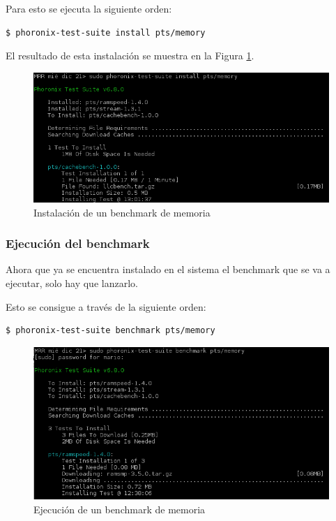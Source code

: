 Para esto se ejecuta la siguiente orden:
\begin{lstlisting}[style=fich]
$ phoronix-test-suite install pts/memory
\end{lstlisting}
\vspace{-20pt}
El resultado de esta instalación se muestra en la Figura \ref{fig:figura1-10}.
\begin{figure}[H] %
	\centering
	\includegraphics[scale=0.8]{figuras/ejercicio1/figura1-10.png} 
	\caption{Instalación de un benchmark de memoria} 
	\label{fig:figura1-10}
\end{figure}

\subsubsection{Ejecución del benchmark}

Ahora que ya se encuentra instalado en el sistema el benchmark que se va a ejecutar, solo hay que lanzarlo.

Esto se consigue a través de la siguiente orden:
\begin{lstlisting}[style=fich]
$ phoronix-test-suite benchmark pts/memory
\end{lstlisting}
\vspace{-28pt}
\begin{figure}[H] %
	\centering
	\includegraphics[scale=0.8]{figuras/ejercicio1/figura1-7.png} 
	\caption{Ejecución de un benchmark de memoria} 
	\label{fig:figura1-7}
\end{figure}

